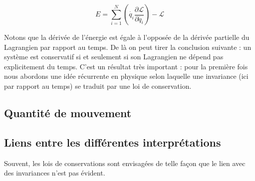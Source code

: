 \begin{equation}
E =  \sum_{i=1}^{N}  \left (\dot{q_i}\dfrac{\partial \mathcal{L}}{\partial \dot{q_i}} \right ) - \mathcal{L}
\end{equation}

Notons que la dérivée de l'énergie est égale à l'opposée de la dérivée partielle du Lagrangien par rapport au temps. De là on peut tirer la conclusion suivante : un système est conservatif si et seulement si son Lagrangien ne dépend pas explicitement du temps. C'est un résultat très important : pour la première fois nous abordons une idée récurrente en physique selon laquelle une invariance (ici par rapport au temps) se traduit par une loi de conservation.

\subsection{Quantité de mouvement}



\subsection{Liens entre les différentes interprétations}

Souvent, les lois de conservations sont envisagées de telle façon que le lien avec des invariances n'est pas évident.

